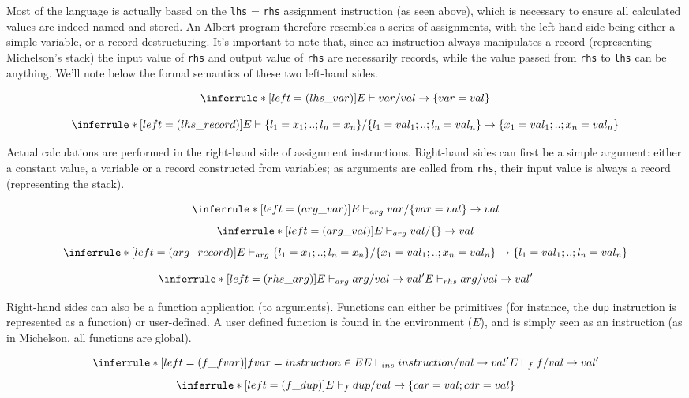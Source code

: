 \documentclass{report}
\begin{document}
Most of the language is actually based on the \texttt{lhs} = \texttt{rhs} assignment instruction (as seen above), which is necessary to ensure all calculated values are indeed named and stored. An Albert program therefore resembles a series of assignments, with the left-hand side being either a simple variable, or a record destructuring. It's important to note that, since an instruction always manipulates a record (representing Michelson's stack) the input value of \lstinline{rhs} and output value of \lstinline{rhs} are necessarily records, while the value passed from \lstinline{rhs} to \lstinline{lhs} can be anything. We'll note below the formal semantics of these two left-hand sides.

$$
\inferrule* [left=(lhs\_var)]
    { }
    { E \vdash var / val \rightarrow \{ var = val \} }
$$

$$
\inferrule* [left=(lhs\_record)]
    { }
    { E \vdash \{ l_1 = x_1 ; .. ; l_n = x_n \} / \{ l_1 = val_1 ; .. ; l_n = val_n \} \rightarrow \{ x_1 = val_1 ; .. ; x_n = val_n \} }
$$

    Actual calculations are performed in the right-hand side of assignment instructions. Right-hand sides can first be a simple argument: either a constant value, a variable or a record constructed from variables; as arguments are called from \lstinline{rhs}, their input value is always a record (representing the stack).

$$
\inferrule* [left=(arg\_var)]
    { }
    { E \vdash_{arg} var / \{ var = val \} \rightarrow val }
$$
$$
\inferrule* [left=(arg\_val)]
    { }
    { E \vdash_{arg} val / \{\} \rightarrow val }
$$
$$
\inferrule* [left=(arg\_record)]
    { }
    { E \vdash_{arg} \{ l_1 = x_1 ; .. ; l_n = x_n \} / \{ x_1 = val_1 ; .. ; x_n = val_n \} \rightarrow \{ l_1 = val_1 ; .. ; l_n = val_n \} }
$$

$$
\inferrule* [left=(rhs\_arg)]
    { E \vdash_{arg} arg / val \rightarrow val' }
    { E \vdash_{rhs} arg / val \rightarrow val' }
$$

Right-hand sides can also be a function application (to arguments). Functions can either be primitives (for instance, the \lstinline{dup} instruction is represented as a function) or user-defined. A user defined function is found in the environment ($E$), and is simply seen as an instruction (as in Michelson, all functions are global).

$$
\inferrule* [left=(f\_fvar)]
    { fvar = instruction \in E \\ E \vdash_{ins} instruction / val \rightarrow val' }
    { E \vdash_{f} f / val \rightarrow val' }
$$
$$
\inferrule* [left=(f\_dup)]
    { }
    { E \vdash_{f} dup / val \rightarrow \{ car = val; cdr = val \} }
$$
\end{document}
